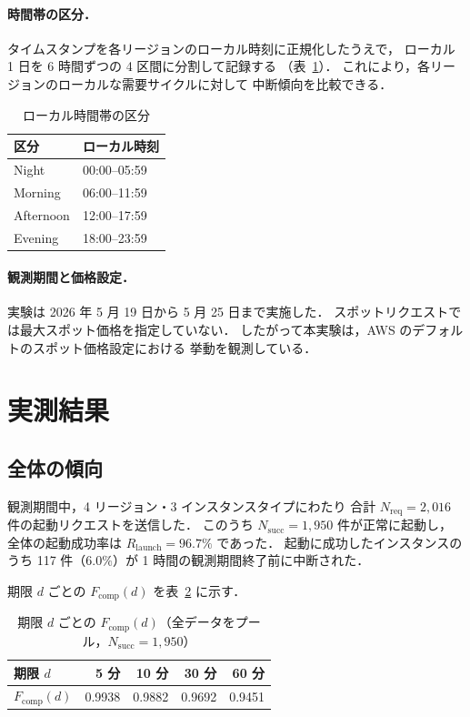 \documentclass[11pt,a4paper]{ltjsreport}
\newcommand{\Fcomp}{F_{\mathrm{comp}}}
\newcommand{\Rlaunch}{R_{\mathrm{launch}}}
\newcommand{\Nreq}{N_{\mathrm{req}}}
\newcommand{\Nsucc}{N_{\mathrm{succ}}}
\begin{document}
\paragraph{時間帯の区分．}
タイムスタンプを各リージョンのローカル時刻に正規化したうえで，
ローカル 1 日を 6 時間ずつの 4 区間に分割して記録する
（表~\ref{tab:periods}）．
これにより，各リージョンのローカルな需要サイクルに対して
中断傾向を比較できる．

\begin{table}[htbp]
\centering
\caption{ローカル時間帯の区分}
\label{tab:periods}
\small
\begin{tabular}{@{}ll@{}}
\toprule
区分 & ローカル時刻 \\
\midrule
Night     & 00:00--05:59 \\
Morning   & 06:00--11:59 \\
Afternoon & 12:00--17:59 \\
Evening   & 18:00--23:59 \\
\bottomrule
\end{tabular}
\end{table}

\paragraph{観測期間と価格設定．}
実験は 2026 年 5 月 19 日から 5 月 25 日まで実施した．
スポットリクエストでは最大スポット価格を指定していない．
したがって本実験は，AWS のデフォルトのスポット価格設定における
挙動を観測している．

\section{実測結果}

\subsection{全体の傾向}

観測期間中，4 リージョン・3 インスタンスタイプにわたり
合計 $\Nreq = 2{,}016$ 件の起動リクエストを送信した．
このうち $\Nsucc = 1{,}950$ 件が正常に起動し，
全体の起動成功率は $\Rlaunch = 96.7\%$ であった．
起動に成功したインスタンスのうち 117 件（$6.0\%$）が
1 時間の観測期間終了前に中断された．

期限 $d$ ごとの $\Fcomp(d)$ を表~\ref{tab:fcomp_overall} に示す．

\begin{table}[htbp]
\centering
\caption{期限 $d$ ごとの $\Fcomp(d)$（全データをプール，$\Nsucc = 1{,}950$）}
\label{tab:fcomp_overall}
\small
\begin{tabular}{@{}lrrrr@{}}
\toprule
期限 $d$ & 5 分 & 10 分 & 30 分 & 60 分 \\
\midrule
$\Fcomp(d)$ & 0.9938 & 0.9882 & 0.9692 & 0.9451 \\
\bottomrule
\end{tabular}
\end{table}
\end{document}
